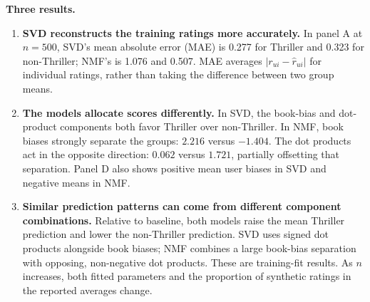 \documentclass[10pt]{article}
\begin{document}
\begin{minipage}[t]{0.51\textwidth}
\textbf{Three results.}
\begin{enumerate}[leftmargin=*,itemsep=3pt,topsep=3pt]
\item \textbf{SVD reconstructs the training ratings more accurately.} In panel A at $n=500$, SVD's mean absolute error (MAE) is 0.277 for Thriller and 0.323 for non-Thriller; NMF's is 1.076 and 0.507. MAE averages $|r_{ui}-\hat r_{ui}|$ for individual ratings, rather than taking the difference between two group means.
\item \textbf{The models allocate scores differently.} In SVD, the book-bias and dot-product components both favor Thriller over non-Thriller. In NMF, book biases strongly separate the groups: $2.216$ versus $-1.404$. The dot products act in the opposite direction: $0.062$ versus $1.721$, partially offsetting that separation. Panel D also shows positive mean user biases in SVD and negative means in NMF.
\item \textbf{Similar prediction patterns can come from different component combinations.} Relative to baseline, both models raise the mean Thriller prediction and lower the non-Thriller prediction. SVD uses signed dot products alongside book biases; NMF combines a large book-bias separation with opposing, non-negative dot products. These are training-fit results. As $n$ increases, both fitted parameters and the proportion of synthetic ratings in the reported averages change.
\end{enumerate}
\end{minipage}
\end{document}
